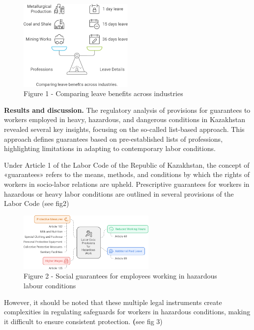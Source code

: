 \begin{figure}[H]
	\centering
	\includegraphics[width=0.5\textwidth]{media/gorn/image2}
	\caption*{Figure 1 - Comparing leave benefits across industries}
\end{figure}


\begin{multicols}{2}
{\bfseries Results and discussion.} The regulatory analysis of provisions for
guarantees to workers employed in heavy, hazardous, and dangerous
conditions in Kazakhstan revealed several key insights, focusing on the
so-called list-based approach. This approach defines guarantees based on
pre-established lists of professions, highlighting limitations in
adapting to contemporary labor conditions.

Under Article 1 of the Labor Code of the Republic of Kazakhstan, the
concept of «guarantees» refers to the means, methods, and conditions by
which the rights of workers in socio-labor relations are upheld.
Prescriptive guarantees for workers in hazardous or heavy labor
conditions are outlined in several provisions of the Labor Code (see
fig2)
\end{multicols}

\begin{figure}[H]
	\centering
	\includegraphics[width=0.6\textwidth]{media/gorn/image3}
	\caption*{Figure 2 - Social guarantees for employees working in hazardous labour conditions}
\end{figure}

However, it should be noted that these multiple legal instruments create
complexities in regulating safeguards for workers in hazardous
conditions, making it difficult to ensure consistent protection.
{\bfseries (}see fig 3)

